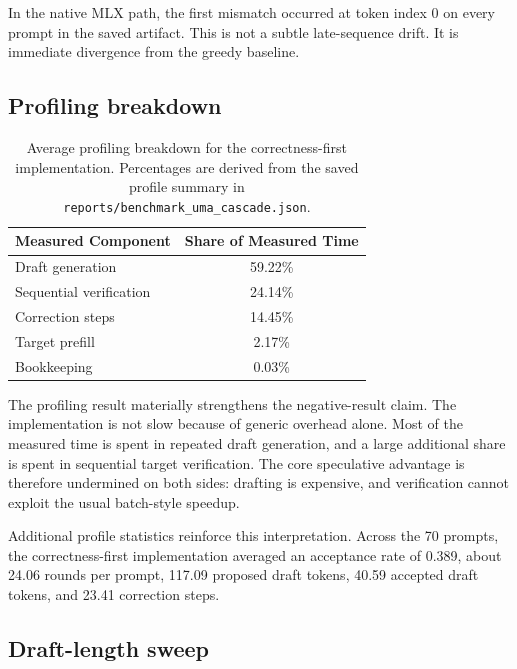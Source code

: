 \documentclass[11pt]{article}
\begin{document}
In the native MLX path, the first mismatch occurred at token index 0 on every prompt in the saved artifact. This is not a subtle late-sequence drift. It is immediate divergence from the greedy baseline.

\subsection{Profiling breakdown}

\begin{table}[h]
\centering
\begin{tabular}{@{}lc@{}}
\toprule
\textbf{Measured Component} & \textbf{Share of Measured Time} \\
\midrule
Draft generation & 59.22\% \\
Sequential verification & 24.14\% \\
Correction steps & 14.45\% \\
Target prefill & 2.17\% \\
Bookkeeping & 0.03\% \\
\bottomrule
\end{tabular}
\caption{Average profiling breakdown for the correctness-first implementation. Percentages are derived from the saved profile summary in \texttt{reports/benchmark\_uma\_cascade.json}.}
\label{tab:profile}
\end{table}

The profiling result materially strengthens the negative-result claim. The implementation is not slow because of generic overhead alone. Most of the measured time is spent in repeated draft generation, and a large additional share is spent in sequential target verification. The core speculative advantage is therefore undermined on both sides: drafting is expensive, and verification cannot exploit the usual batch-style speedup.

Additional profile statistics reinforce this interpretation. Across the 70 prompts, the correctness-first implementation averaged an acceptance rate of 0.389, about 24.06 rounds per prompt, 117.09 proposed draft tokens, 40.59 accepted draft tokens, and 23.41 correction steps.

\subsection{Draft-length sweep}
\end{document}
